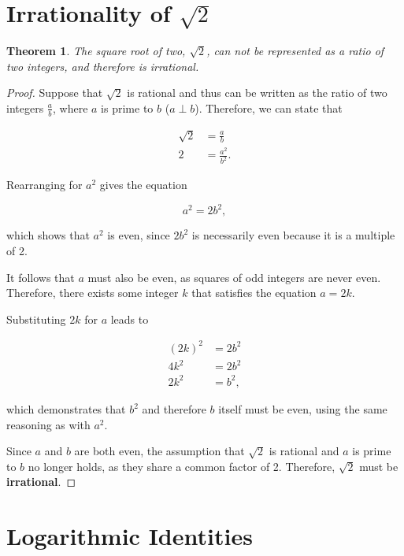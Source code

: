 \documentclass[parskip]{scrartcl}
\newtheorem*{theorem}{Theorem}
\begin{document}
\section{Irrationality of \(\sqrt{2}\)}

\begin{theorem}
  The square root of two, \(\sqrt{2}\), can not be represented as a ratio of two
  integers, and therefore is irrational.
\end{theorem}

\begin{proof}
  Suppose that \(\sqrt{2}\) is rational and thus can be written as the ratio of
  two integers \(\frac{a}{b}\), where \(a\) is prime to \(b\) (\(a ⟂ b\)).
  Therefore, we can state that

  \begin{align*}
    \sqrt{2} &= \frac{a}{b} \\
    2 &= \frac{a^{2}}{b^{2}}.
  \end{align*}

  Rearranging for \(a^{2}\) gives the equation

  \begin{equation*}
    a^{2} = 2b^{2},
  \end{equation*}

  which shows that \(a^{2}\) is even, since \(2b^{2}\) is necessarily even
  because it is a multiple of 2.

  It follows that \(a\) must also be even, as squares of odd integers are never
  even. Therefore, there exists some integer \(k\) that satisfies the equation
  \(a = 2k\).

  Substituting \(2k\) for \(a\) leads to

  \begin{align*}
    {(2k)}^{2} &= 2b^{2} \\
    4k^{2} &= 2b^{2} \\
    2k^{2} &= b^{2},
  \end{align*}

  which demonstrates that \(b^{2}\) and therefore \(b\) itself must be even,
  using the same reasoning as with \(a^{2}\).

  Since \(a\) and \(b\) are both even, the assumption that \(\sqrt{2}\) is
  rational and \(a\) is prime to \(b\) no longer holds, as they share a common
  factor of 2. Therefore, \(\sqrt{2}\) must be \textbf{irrational}.
\end{proof}

\section{Logarithmic Identities}
\end{document}

